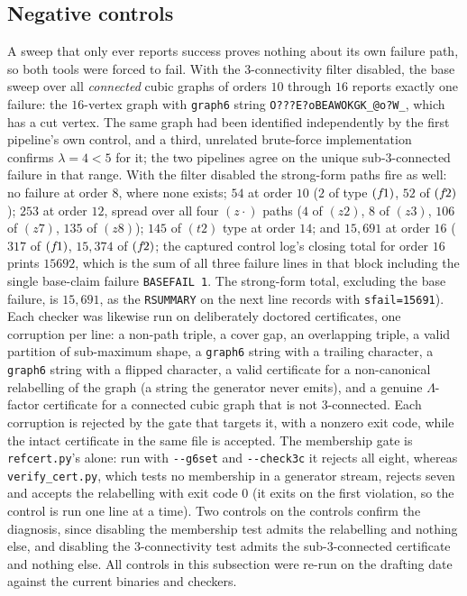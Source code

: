 \documentclass[11pt]{amsart}
\newcommand{\Lam}{\Lambda}
\theoremstyle{plain}
\theoremstyle{definition}
\theoremstyle{remark}
\begin{document}
\subsection{Negative controls}\label{ssec:negctl}
A sweep that only ever reports success proves nothing about its own
failure path, so both tools were forced to fail. With the
$3$-connectivity filter disabled, the base sweep over all \emph{connected}
cubic graphs of orders $10$ through $16$ reports exactly one failure: the
$16$-vertex graph with \texttt{graph6} string
\texttt{O???E?oBEAWOKGK\_@o?W\_}, which has a cut vertex. The same graph
had been identified independently by the first pipeline's own control,
and a third, unrelated brute-force implementation confirms $\lambda=4<5$
for it; the two pipelines agree on the unique sub-$3$-connected failure in
that range. With the filter disabled the strong-form paths fire as well:
no failure at order $8$, where none exists; $54$ at order $10$ ($2$ of
type $(f\mkern-2mu1)$, $52$ of $(f\mkern-2mu2)$); $253$ at order $12$,
spread over all four $(z\cdot)$ paths ($4$ of $(z2)$, $8$ of $(z3)$, $106$
of $(z7)$, $135$ of $(z8)$); $145$ of $(t2)$ type at order $14$; and
$15{,}691$ at order $16$ ($317$ of $(f\mkern-2mu1)$, $15{,}374$ of
$(f\mkern-2mu2)$; the captured control log's closing total for order $16$
prints $15692$, which is the sum of all three failure lines in that block
including the single base-claim failure \texttt{BASEFAIL 1}. The
strong-form total, excluding the base failure, is $15{,}691$, as the
\texttt{RSUMMARY} on the next line records with
\texttt{sfail=15691}). Each checker was likewise run on deliberately doctored
certificates, one corruption per line: a non-path triple, a cover gap, an
overlapping triple, a valid partition of sub-maximum shape, a
\texttt{graph6} string with a trailing character, a \texttt{graph6}
string with a flipped character, a valid certificate for a non-canonical
relabelling of the graph (a string the generator never emits), and a
genuine $\Lam$-factor certificate for a connected cubic graph that is not
$3$-connected. Each corruption is rejected by the gate that targets it,
with a nonzero exit code, while the intact certificate in the same file
is accepted. The membership gate is \texttt{refcert.py}'s alone: run with
\texttt{-{}-g6set} and \texttt{-{}-check3c} it rejects all eight, whereas
\texttt{verify\_cert.py}, which tests no membership in a generator
stream, rejects seven and accepts the relabelling with exit code $0$ (it
exits on the first violation, so the control is run one line at a time).
Two controls on the controls confirm the diagnosis, since
disabling the membership test admits the relabelling and nothing else,
and disabling the $3$-connectivity test admits the sub-$3$-connected
certificate and nothing else. All controls in this subsection were re-run
on the drafting date against the current binaries and checkers.
\end{document}
